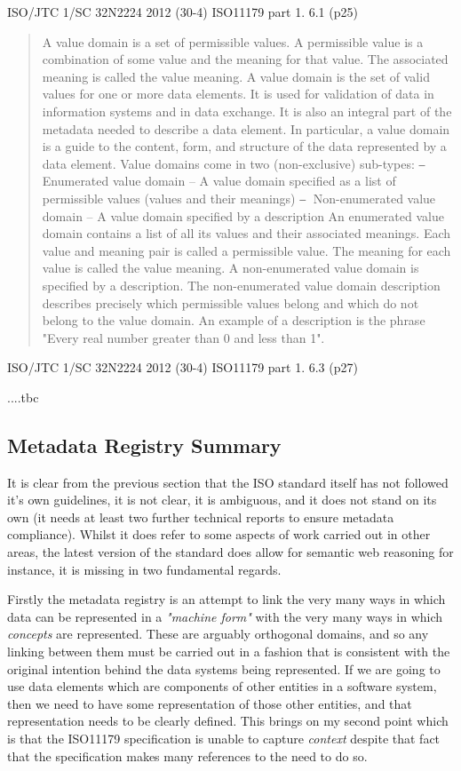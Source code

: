 \documentclass{article}
\begin{document}
ISO/JTC 1/SC 32N2224
2012 (30-4) ISO11179 part 1. 6.1 (p25)
\begin{quote}
	A value domain is a set of permissible values. A permissible value is a combination of some value and the
	meaning for that value. The associated meaning is called the value meaning. A value domain is the set of
	valid values for one or more data elements. It is used for validation of data in information systems and in data
	exchange. It is also an integral part of the metadata needed to describe a data element. In particular, a value
	domain is a guide to the content, form, and structure of the data represented by a data element.
	Value domains come in two (non-exclusive) sub-types:
	⎯ Enumerated value domain – A value domain specified as a list of permissible values (values and their meanings)
	⎯ Non-enumerated value domain – A value domain specified by a description
	An enumerated value domain contains a list of all its values and their associated meanings. Each value and
	meaning pair is called a permissible value. The meaning for each value is called the value meaning.
	A non-enumerated value domain is specified by a description. The non-enumerated value domain
	description describes precisely which permissible values belong and which do not belong to the value
	domain. An example of a description is the phrase "Every real number greater than 0 and less than 1".
\end{quote}
ISO/JTC 1/SC 32N2224
2012 (30-4) ISO11179 part 1. 6.3 (p27)



....tbc


\subsection{Metadata Registry Summary}

It is clear from the previous section that the ISO standard itself has not followed it's own guidelines, it is not clear, it is ambiguous, and it does not stand on its own (it needs at least two further technical reports to ensure metadata compliance). Whilst it does refer to some aspects of work carried out in other areas, the latest version of the standard does allow for semantic web reasoning for instance, it is missing in two fundamental regards.

Firstly the metadata registry is an attempt to link the very many ways in which data can be represented in a \emph{"machine form"} with the very many ways in which \emph{concepts} are represented.  These are arguably orthogonal domains, and so any linking between them must be carried out in a fashion that is consistent with the original intention behind the data systems being represented. If we are going to use data elements which are components of other entities in a software system, then we need to have some representation of those other entities, and that representation needs to be clearly defined. This brings on my second point which is that the ISO11179 specification is unable to capture \emph{context} despite that fact that the specification makes many references to the need to do so.
\end{document}
